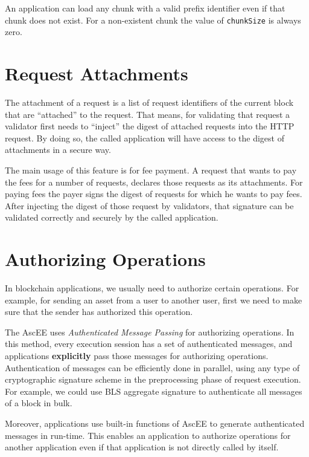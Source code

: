 An application can load any chunk with a valid prefix identifier even if that chunk does not exist. For a non-existent
chunk the value of \texttt{chunkSize} is always zero.


\section{Request Attachments}\label{sec:attachments}

The attachment of a request is a list of request identifiers of the current block that are ``attached'' to the request.
That means, for validating that request a validator first needs to ``inject'' the digest of attached requests into the
HTTP request. By doing so, the called application will have access to the digest of attachments in a secure way.

The main usage of this feature is for fee payment. A request that wants to pay the fees for a number of requests,
declares those requests as its attachments. For paying fees the payer signs the digest of requests for which he
wants to pay fees. After injecting the digest of those request by validators, that signature can be validated
correctly and securely by the called application.


\section{Authorizing Operations}\label{sec:authorizing-operations}

In blockchain applications, we usually need to authorize certain operations. For example, for sending an asset
from a user to another user, first we need to make sure that the sender has authorized this operation.

The AscEE uses \emph{Authenticated Message Passing} for authorizing operations. In this method, every execution
session has a set of authenticated messages, and applications \textbf{explicitly} pass those messages for authorizing
operations.
Authentication of messages can be efficiently done in parallel, using any type of cryptographic signature scheme in
the preprocessing phase of request execution. For example, we could use BLS aggregate signature to authenticate all
messages of a block in bulk.

Moreover, applications use built-in functions of AscEE to generate authenticated messages in run-time. This enables
an application to authorize operations for another application even if that application is not directly called by
itself.

